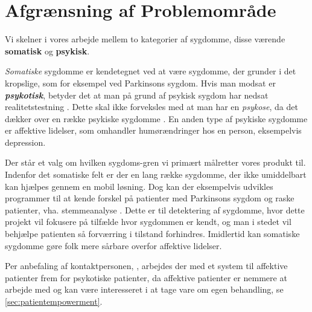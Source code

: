 \section{Afgrænsning af Problemområde}
Vi skelner i vores arbejde mellem to kategorier af sygdomme, disse værende \textbf{somatisk} og \textbf{psykisk}.

\textit{Somatiske} sygdomme er kendetegnet ved at være sygdomme, der grunder i det kropslige, som for eksempel ved Parkinsons sygdom.
Hvis man modsat er \textbf{\textit{psykotisk}}, betyder det at man på grund af psykisk sygdom har nedsat realitetstestning \citep{misc:netpsykpsykose}.
Dette skal ikke forveksles med at man har en \textit{psykose}, da det dækker over en række psykiske sygdomme \citep{misc:netpsykpsykose}.
En anden type af psykiske sygdomme er affektive lidelser, som omhandler humørændringer hos en person, eksempelvis depression.

Der står et valg om hvilken sygdoms-gren vi primært målretter vores produkt til.
Indenfor det somatiske felt er der en lang række sygdomme, der ikke umiddelbart kan hjælpes gennem en mobil løsning.
Dog kan der eksempelvis udvikles programmer til at kende forskel på patienter med Parkinsons sygdom og raske patienter, vha. stemmeanalyse \citep{6168572}.
Dette er til detektering af sygdomme, hvor dette projekt vil fokusere på tilfælde hvor sygdommen er kendt, og man i stedet vil behjælpe patienten så forværring i tilstand forhindres.
Imidlertid kan somatiske sygdomme gøre folk mere sårbare overfor affektive lidelser.

Per anbefaling af kontaktpersonen, \citet{misc:janne-rasmussen}, arbejdes der med et system til affektive patienter frem for psykotiske patienter, da affektive patienter er nemmere at arbejde med og kan være interesseret i at tage vare om egen behandling, se \cref{sec:patientempowerment}.

